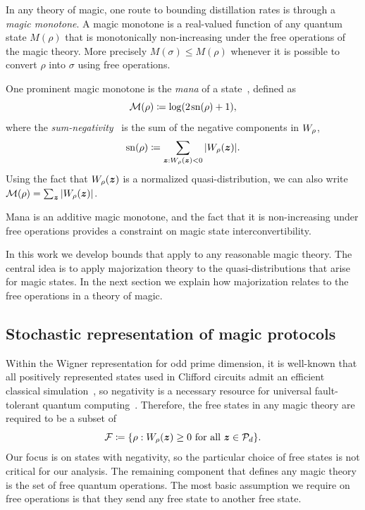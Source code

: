 \documentclass[pra,
aps,
twocolumn,
superscriptaddress,
groupedaddress,
nofootinbib,
reprint
]{revtex4-1}
\begin{document}
In any theory of magic, one route to bounding distillation rates is through a \emph{magic monotone}. A magic monotone is a real-valued function of any quantum state $M(\rho)$ that is monotonically non-increasing under the free operations of the magic theory. More precisely $M(\sigma) \le M(\rho)$ whenever it is possible to convert $\rho$ into $\sigma$ using free operations.

One prominent magic monotone is the \emph{mana} of a state~\cite{cit:veitch2}, defined as
\begin{equation}
    {\mathcal M}(\rho) \coloneqq \log (2\hspace{1pt}{{\rm{sn}}(\rho)}+1),
\end{equation}
where the \emph{sum-negativity}~\cite{cit:veitch2} is the sum of the negative components in $\W{\rho}$,
\begin{equation}
    \sn{\rho} \coloneqq \sum\limits_{\bmz: \W[\bmz]{\rho} < 0} \abs{\W[\bmz]{\rho}}.
\end{equation}
Using the fact that $W_\rho(\boldsymbol{z})$ is a normalized quasi-distribution, we can also write ${\mathcal M}(\rho) = \sum_{\boldsymbol{z}} |W_\rho(\boldsymbol{z})|$.

Mana is an additive magic monotone, and the fact that it is non-increasing under free operations provides a constraint on magic state interconvertibility.

In this work we develop bounds that apply to any reasonable magic theory. The central idea is to apply majorization theory to the quasi-distributions that arise for magic states. In the next section we explain how majorization relates to the free operations in a theory of magic.


\subsection{Stochastic representation of magic protocols}
\label{sec:struc}

Within the Wigner representation for odd prime dimension, it is well-known that all positively represented states used in Clifford circuits admit an efficient classical simulation~\cite{cit:mari}, so negativity is a necessary resource for universal fault-tolerant quantum computing~\cite{cit:veitch}. Therefore, the free states in any magic theory are required to be a subset of
\begin{equation}
    \F \coloneqq \{ \rho: \W[\bmz]{\rho} \geq 0 \text{ for all } \bmz \in \cal{P}_d\}.
\end{equation}
Our focus is on states with negativity, so the particular choice of free states is not critical for our analysis. The remaining component that defines any magic theory is the set of free quantum operations. The most basic assumption we require on free operations is that they send any free state to another free state.
\end{document}
